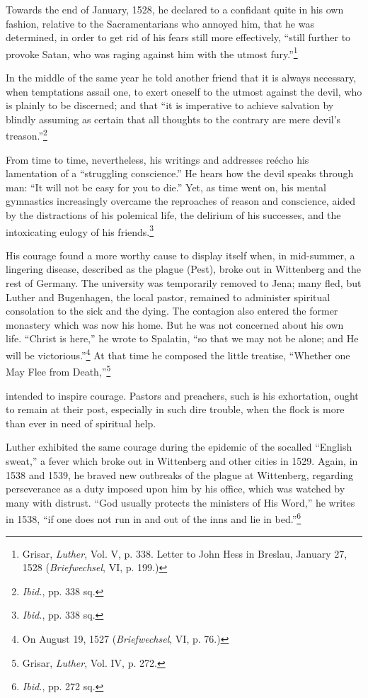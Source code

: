 Towards the end of January, 1528, he declared to a confidant quite
in his own fashion, relative to the Sacramentarians who annoyed him,
that he was determined, in order to get rid of his fears still more
effectively, “still further to provoke Satan, who was raging against
him with the utmost fury.”\footnote
{Grisar, \textit{Luther}, Vol. V, p. 338. Letter to John Hess in Breslau, January 27, 1528
(\textit{Briefwechsel}, VI, p. 199.)}

In the middle of the same year he told another friend that it is
always necessary, when temptations assail one, to exert oneself to the
utmost against the devil, who is plainly to be discerned; and that
“it is imperative to achieve salvation by blindly assuming as certain
that all thoughts to the contrary are mere devil’s treason.”\footnote{\textit{Ibid.}, pp. 338 sq.}

From time to time, nevertheless, his writings and addresses reécho
his lamentation of a “struggling conscience.” He hears how the devil
speaks through man: “It will not be easy for you to die.” Yet, as
time went on, his mental gymnastics increasingly overcame the reproaches
of reason and conscience, aided by the distractions of his
polemical life, the delirium of his successes, and the intoxicating
eulogy of his friends.\footnote{\textit{Ibid.}, pp. 338 sq.}

His courage found a more worthy cause to display itself when, in
mid-summer, a lingering disease, described as the plague (Pest), broke
out in Wittenberg and the rest of Germany. The university was
temporarily removed to Jena; many fled, but Luther and Bugenhagen,
the local pastor, remained to administer spiritual consolation
to the sick and the dying. The contagion also entered the former
monastery which was now his home. But he was not concerned
about his own life. “Christ is here,” he wrote to Spalatin, “so that we
may not be alone; and He will be victorious.”\footnote{On August 19, 1527 (\textit{Briefwechsel}, VI, p. 76.)}
 At that time he
composed the little treatise, “Whether one May Flee from Death,”\footnote{Grisar, \textit{Luther}, Vol. IV, p. 272.}

intended to inspire courage. Pastors and preachers, such is his exhortation,
ought to remain at their post, especially in such dire
trouble, when the flock is more than ever in need of spiritual help.

Luther exhibited the same courage during the epidemic of the socalled
“English sweat,” a fever which broke out in Wittenberg and
other cities in 1529. Again, in 1538 and 1539, he braved new outbreaks
of the plague at Wittenberg, regarding perseverance as a duty
imposed upon him by his office, which was watched by many with distrust.
“God usually protects the ministers of His Word,” he writes in
1538, “if one does not run in and out of the inns and lie in bed.”\footnote{\textit{Ibid.}, pp. 272 sq.}

